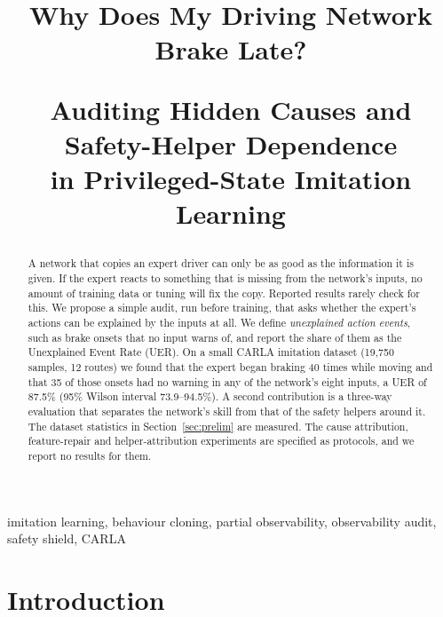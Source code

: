 \documentclass[conference]{IEEEtran}
\begin{document}
\title{Why Does My Driving Network Brake Late?\\[4pt]
{\Large Auditing Hidden Causes and Safety-Helper Dependence\\
in Privileged-State Imitation Learning\par}}

\author{
}

\maketitle

\begin{abstract}
A network that copies an expert driver can only be as good as the
information it is given. If the expert reacts to something that is
missing from the network's inputs, no amount of training data or tuning
will fix the copy. Reported results rarely check for this. We propose a
simple audit, run before training, that asks whether the expert's
actions can be explained by the inputs at all. We define
\emph{unexplained action events}, such as brake onsets that no input
warns of, and report the share of them as the Unexplained Event Rate
(UER). On a small CARLA imitation dataset (19{,}750 samples, 12 routes)
we found that the expert began braking 40 times while moving and that
35 of those onsets had no warning in any of the network's eight inputs,
a UER of 87.5\% (95\% Wilson interval 73.9--94.5\%). A second
contribution is a three-way evaluation that separates the network's
skill from that of the safety helpers around it. The dataset statistics
in Section~\ref{sec:prelim} are measured. The cause attribution,
feature-repair and helper-attribution experiments are specified as
protocols, and we report no results for them.
\end{abstract}

\begin{IEEEkeywords}
imitation learning, behaviour cloning, partial observability,
observability audit, safety shield, CARLA
\end{IEEEkeywords}

\section{Introduction}
\end{document}
